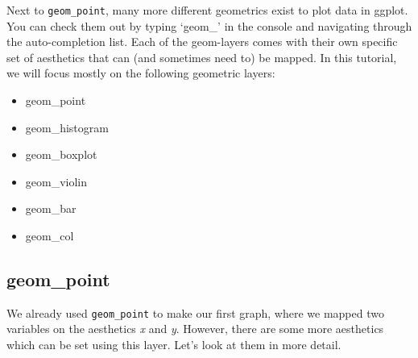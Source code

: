 \documentclass[]{tufte-book}
\providecommand{\tightlist}{%
  \setlength{\itemsep}{0pt}\setlength{\parskip}{0pt}}
\begin{document}
Next to \texttt{geom\_point}, many more different geometrics exist to plot data in ggplot. You can check them out by typing `geom\_' in the console and navigating through the auto-completion list. Each of the geom-layers comes with their own specific set of aesthetics that can (and sometimes need to) be mapped. In this tutorial, we will focus mostly on the following geometric layers:

\begin{itemize}
\tightlist
\item
  geom\_point
\item
  geom\_histogram
\item
  geom\_boxplot
\item
  geom\_violin
\item
  geom\_bar
\item
  geom\_col
\end{itemize}

\hypertarget{geom_point}{%
\subsection{geom\_point}\label{geom_point}}

We already used \texttt{geom\_point} to make our first graph, where we mapped two variables on the aesthetics \emph{x} and \emph{y}. However, there are some more aesthetics which can be set using this layer. Let's look at them in more detail.
\end{document}
